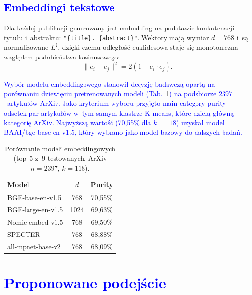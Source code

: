 \documentclass[a4paper,11pt,twocolumn]{article}
\newcommand{\hl}[1]{\textcolor{blue}{#1}}
\begin{document}
\subsection{\hl{Embeddingi tekstowe}}

Dla każdej publikacji generowany jest embedding na podstawie konkatenacji
tytułu i~abstraktu: \texttt{"\{title\}. \{abstract\}"}. Wektory mają
wymiar $d=768$ i~są normalizowane $L^2$, dzięki czemu odległość
euklidesowa staje się monotoniczna względem podobieństwa kosinusowego:
\begin{equation}
  \|e_i - e_j\|^2 = 2(1 - e_i \cdot e_j).
  \label{eq:cosine}
\end{equation}

\hl{Wybór modelu embeddingowego stanowił decyzję badawczą opartą
na porównaniu dziewięciu pretrenowanych modeli (Tab.~\ref{tab:models})
na podzbiorze $2397$~artykułów ArXiv. Jako kryterium wyboru przyjęto
main-category purity --- odsetek par artykułów w~tym samym klastrze
K-means, które dzielą główną kategorię ArXiv. Najwyższą wartość
(70,55\% dla $k=118$) uzyskał model BAAI/bge-base-en-v1.5, który
wybrano jako model bazowy do dalszych badań.}

\begin{table}[t]
\centering
\caption{Porównanie modeli embeddingowych (top~5 z~9 testowanych,
ArXiv $n=2397$, $k=118$).}
\label{tab:models}
\small
\begin{tabular}{@{}lcc@{}}
\toprule
Model & $d$ & Purity \\
\midrule
BGE-base-en-v1.5    & 768  & 70,55\% \\
BGE-large-en-v1.5   & 1024 & 69,63\% \\
Nomic-embed-v1.5    & 768  & 69,50\% \\
SPECTER             & 768  & 68,88\% \\
all-mpnet-base-v2   & 768  & 68,09\% \\
\bottomrule
\end{tabular}
\end{table}



\section{\hl{Proponowane podejście}}
\label{sec:method}
\end{document}
